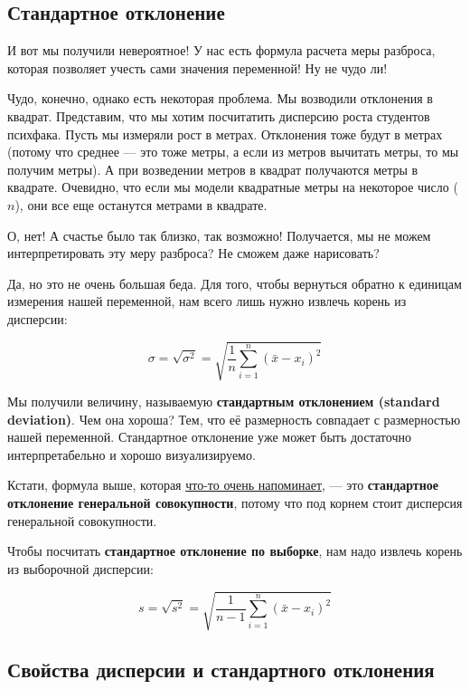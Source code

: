 \documentclass[
  letterpaper,
  DIV=11,
  numbers=noendperiod]{scrreprt}
\theoremstyle{definition}
\theoremstyle{remark}
\begin{document}
\subsection{Стандартное
отклонение}\label{andan-descriptives-standard-deviation}

И вот мы получили невероятное! У нас есть формула расчета меры разброса,
которая позволяет учесть сами значения переменной! Ну не чудо ли!

Чудо, конечно, однако есть некоторая проблема. Мы возводили отклонения в
квадрат. Представим, что мы хотим посчитатить дисперсию роста студентов
психфака. Пусть мы измеряли рост в метрах. Отклонения тоже будут в
метрах (потому что среднее --- это тоже метры, а если из метров вычитать
метры, то мы получим метры). А при возведении метров в квадрат
получаются метры в квадрате. Очевидно, что если мы модели квадратные
метры на некоторое число (\(n\)), они все еще останутся метрами в
квадрате.

О, нет! А счастье было так близко, так возможно! Получается, мы не можем
интерпретировать эту меру разброса? Не сможем даже нарисовать?

Да, но это не очень большая беда. Для того, чтобы вернуться обратно к
единицам измерения нашей переменной, нам всего лишь нужно извлечь корень
из дисперсии:

\[
\sigma = \sqrt{\sigma^2} = \sqrt{\frac{1}{n} \sum_{i=1}^n (\bar x - x_i)^2}
\]

Мы получили величину, называемую \textbf{стандартным отклонением
(standard deviation)}. Чем она хороша? Тем, что её размерность совпадает
с размерностью нашей переменной. Стандартное отклонение уже может быть
достаточно интерпретабельно и хорошо визуализируемо.

Кстати, формула выше, которая \hyperref[quadratic_mean]{что-то очень
напоминает}, --- это \textbf{стандартное отклонение генеральной
совокупности}, потому что под корнем стоит дисперсия генеральной
совокупности.

Чтобы посчитать \textbf{стандартное отклонение по выборке}, нам надо
извлечь корень из выборочной дисперсии:

\[
s = \sqrt{s^2} = \sqrt{\frac{1}{n-1} \sum_{i=1}^n (\bar x - x_i)^2}
\]

\subsection{Свойства дисперсии и стандартного
отклонения}\label{andan_descriptives_var_features}
\end{document}
